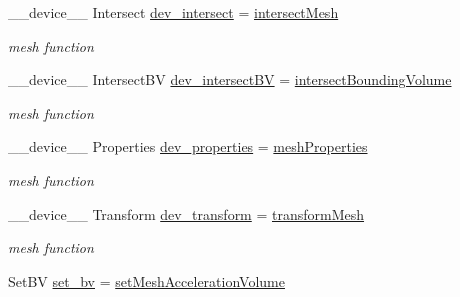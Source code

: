 \begin{DoxyCompactItemize}
\item 
\+\_\+\+\_\+device\+\_\+\+\_\+ Intersect \hyperlink{group__device__pointers_ga00654ffb007d4b5c95c00b429dc26ae9}{dev\+\_\+intersect} = \hyperlink{group__intersection__test__prperties_gac9af7cfe676f4df793dea5bc53171161}{intersect\+Mesh}\hypertarget{group__device__pointers_ga00654ffb007d4b5c95c00b429dc26ae9}{}\label{group__device__pointers_ga00654ffb007d4b5c95c00b429dc26ae9}

\begin{DoxyCompactList}\small\item\em mesh function \end{DoxyCompactList}\item 
\+\_\+\+\_\+device\+\_\+\+\_\+ Intersect\+BV \hyperlink{group__device__pointers_gaeee39cf2f67c91f2a6c312651283dc94}{dev\+\_\+intersect\+BV} = \hyperlink{group__intersection__test__prperties_gaf6bbee9e8a6ee564017fa94cd9e6ec63}{intersect\+Bounding\+Volume}\hypertarget{group__device__pointers_gaeee39cf2f67c91f2a6c312651283dc94}{}\label{group__device__pointers_gaeee39cf2f67c91f2a6c312651283dc94}

\begin{DoxyCompactList}\small\item\em mesh function \end{DoxyCompactList}\item 
\+\_\+\+\_\+device\+\_\+\+\_\+ Properties \hyperlink{group__device__pointers_gac0d627981d2453b8f45dc3cca7a69a28}{dev\+\_\+properties} = \hyperlink{group__intersection__test__prperties_gaa26e85d7aac46c25d6a1b975423f968d}{mesh\+Properties}\hypertarget{group__device__pointers_gac0d627981d2453b8f45dc3cca7a69a28}{}\label{group__device__pointers_gac0d627981d2453b8f45dc3cca7a69a28}

\begin{DoxyCompactList}\small\item\em mesh function \end{DoxyCompactList}\item 
\+\_\+\+\_\+device\+\_\+\+\_\+ Transform \hyperlink{group__device__pointers_gac3760d5ca4da6826e005200738140558}{dev\+\_\+transform} = \hyperlink{group__intersection__test__prperties_ga4b2a399a49c34312c8369f54b79230af}{transform\+Mesh}\hypertarget{group__device__pointers_gac3760d5ca4da6826e005200738140558}{}\label{group__device__pointers_gac3760d5ca4da6826e005200738140558}

\begin{DoxyCompactList}\small\item\em mesh function \end{DoxyCompactList}\item 
Set\+BV \hyperlink{group__device__pointers_gab0ffce09c75b9b50bae6f2a547e8302e}{set\+\_\+bv} = \hyperlink{group__intersection__test__prperties_ga672ecbee3aea2f5567ad7a2611feef3e}{set\+Mesh\+Acceleration\+Volume}\hypertarget{group__device__pointers_gab0ffce09c75b9b50bae6f2a547e8302e}{}\label{group__device__pointers_gab0ffce09c75b9b50bae6f2a547e8302e}


\end{DoxyCompactItemize}
